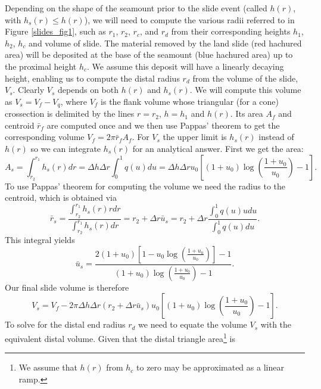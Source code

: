 \documentclass[12pt,letterpaper,margin=0.5in]{report}
\begin{document}
Depending on the shape of the seamount prior to the slide event (called $h(r)$, with $h_s(r) \le h(r)$), we will need to compute the various radii referred
to in Figure \ref{slides_fig1}, such as $r_1$, $r_2$, $r_c$, and $r_d$ from their corresponding heights $h_1$, $h_2$, $h_c$ and volume of slide.
The material removed by the land slide (red hachured area)
will be deposited at the base of the seamount (blue hachured area) up to the proximal height $h_c$.  We assume this deposit will have a linearly
decaying height, enabling us to compute the distal radius $r_d$ from the volume of the slide, $V_s$.  Clearly $V_s$ depends
on both $h(r)$ and $h_s(r)$.  We will compute this volume as $V_s = V_f - V_q$, where $V_f$ is the flank volume whose
triangular (for a cone) crossection is delimited by the lines $r = r_2$, $h = h_1$ and $h(r)$.  Its area $A_f$ and centroid $\bar{r}_f$ are computed once and
we then use Pappas' theorem to get the corresponding volume $V_f = 2 \pi \bar{r}_f A_f$.  For $V_s$ the upper limit is $h_s(r)$ instead of $h(r)$ so we can integrate
$h_s(r)$ for an analytical answer. First we get the area:
\begin{equation}
A_s = \int_{r_2}^{r_1} h_s(r) dr = \Delta h \Delta r \int_0^1 q(u) du = \Delta h \Delta r u_0 \left [ (1 + u_0) \log \left (\frac{1 + u_0}{u_0} \right ) - 1 \right ].
\end{equation}
To use Pappas' theorem for computing the volume we need the radius to the centroid, which is obtained via
\begin{equation}
\bar{r}_s = \frac{\int_{r_2}^{r_1}h_s(r)rdr}{\int_{r_2}^{r_1}h_s(r)dr} = r_2 + \Delta r \bar{u}_s = r_2 + \Delta r \frac{\int_0^1q(u)udu}{\int_0^1 q(u)du}.
\end{equation}
This integral yields
\begin{equation}
\bar{u}_s = \frac{2(1 + u_0)\left [1 - u_0 \log \left ( \frac{1+u_0}{u_0} \right ) \right ] - 1}{(1 + u_0) \log \left (\frac{1 + u_0}{u_0} \right ) - 1}.
\end{equation}
Our final slide volume is therefore
\begin{equation}
V_s = V_f - 2 \pi \Delta h \Delta r \left ( r_2 + \Delta r\bar{u}_s \right ) u_0 \left [ (1 + u_0) \log \left (\frac{1 + u_0}{u_0} \right ) - 1 \right ].
\end{equation}
To solve for the distal end radius $r_d$ we need to equate the volume $V_s$ with the equivalent distal volume.
Given that the distal triangle area\footnote{We assume that $h(r)$ from $h_c$ to zero may be approximated as a linear ramp.} is
\end{document}
